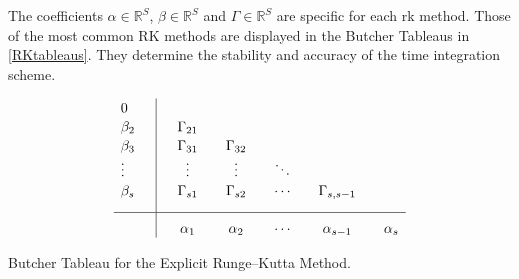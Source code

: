 	The coefficients $\alpha \in \mathbb{R}^S$, $\beta \in \mathbb{R}^S$ and $\Gamma \in \mathbb{R}^S$ are specific for each \gls{rk} method. Those of the most common RK methods are displayed in the Butcher Tableaus in \ref{RKtableaus}. They determine the stability and accuracy of the time integration scheme. \\
\begin{table}[h]
	\begin{equation*}
		\begin{array}{l | c c c c c}
			\rule{0pt}{2,3ex} 0      \quad &             &               &              &         &   \\
			\rule{0pt}{2,3ex} \beta_2    \quad & \quad \Gamma_{21}  &              &              &         &   \\
			\rule{0pt}{2,3ex} \beta_3    \quad & \quad \Gamma_{31}  & \quad \Gamma_{32}  &              &         &   \\
			\rule{0pt}{2,3ex} \vdots \quad & \quad \vdots & \quad \vdots & \quad \ddots &         &   \\
			\rule{0pt}{2,3ex} \beta_s    \quad & \quad \Gamma_{s1}  & \quad \Gamma_{s2}  & \quad \cdots & \quad \Gamma_{s,s-1} & \\[2,0ex] \hline
			\rule{0pt}{3,3ex}              & \quad \alpha_{1}  & \quad \alpha_{2}    & \quad \cdots & \quad \alpha_{s-1}  & \quad \alpha_{s}
		\end{array}
	\end{equation*}
	\caption{Butcher Tableau for the Explicit Runge–Kutta Method.}
	\label{tab:RKexplicit}
\end{table}		


